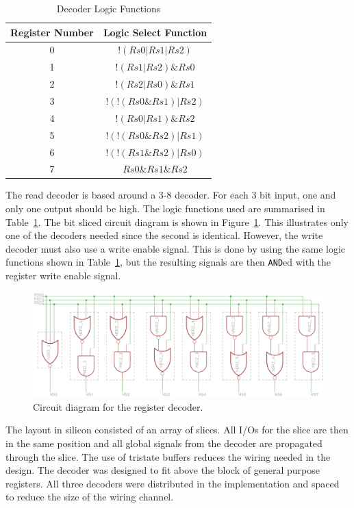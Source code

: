 \begin{table}
\caption{Decoder Logic Functions}
\label{tab:reg:decoder}
\centering
\begin{tabular}{|c|c|}\hline
Register Number & Logic Select Function \\ \hline
0		&		$!( Rs0 | Rs1 | Rs2 )$ \\
1		&		$ !( Rs1 | Rs2 ) \& Rs0$	\\
2		&		$!( Rs2 | Rs0 ) \& Rs1$\\
3		&		$! ( ! ( Rs0 \& Rs1 ) | Rs2 )$	\\
4		&		$!( Rs0 | Rs1 ) \& Rs2$	\\
5		&		$! ( ! ( Rs0 \& Rs2 ) | Rs1 )$	\\
6		&		$! ( ! ( Rs1 \& Rs2 ) | Rs0 )$	\\
7		&		$Rs0 \& Rs1 \& Rs2$	\\ \hline
\end{tabular}

\end{table}

The read decoder is based around a 3-8 decoder. 
For each 3 bit input, one and only one output should be high. 
The logic functions used are summarised in Table~\ref{tab:reg:decoder}.
The bit sliced circuit diagram is shown in Figure~\ref{fig:reg:decoder}.
This illustrates only one of the decoders needed since the second is identical.
However, the write decoder must also use a write enable signal.
This is done by using the same logic functions shown in Table~\ref{tab:reg:decoder}, but the resulting signals are then \texttt{AND}ed with the register write enable signal. 

\begin{figure}
\centering
\includegraphics[width=\textwidth]{../../eagle/regBlock/regBlock_decoder.png}
\caption{Circuit diagram for the register decoder.}
\label{fig:reg:decoder}
\end{figure}

The layout in silicon consisted of an array of slices. 
All I/Os for the slice are then in the same position and all global signals from the decoder are propagated through the slice.
The use of tristate buffers reduces the wiring needed in the design. 
The decoder was designed to fit above the block of general purpose registers. 
All three decoders were distributed in the implementation and spaced to reduce the size of the wiring channel.
